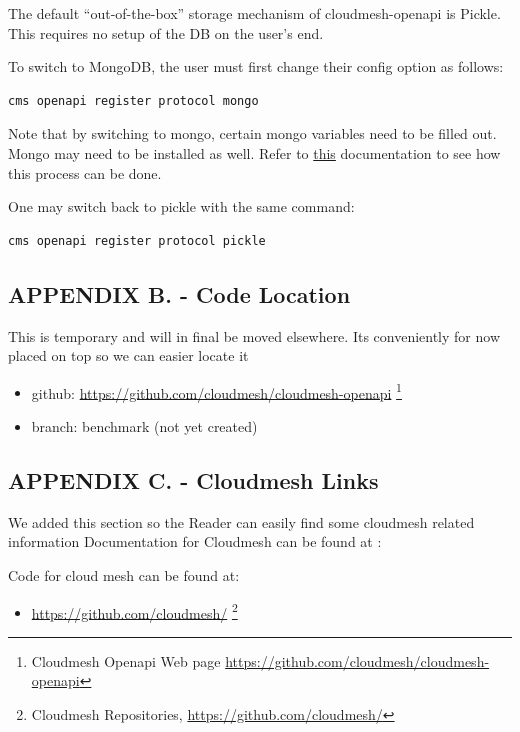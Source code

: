 The default ``out-of-the-box'' storage mechanism of cloudmesh-openapi is
Pickle. This requires no setup of the DB on the user's end.

To switch to MongoDB, the user must first change their config option as
follows:

\begin{verbatim}
cms openapi register protocol mongo
\end{verbatim}

Note that by switching to mongo, certain mongo variables need to be
filled out. Mongo may need to be installed as well. Refer to
\href{https://github.com/cloudmesh/cloudmesh-openapi/\#installation}{this}
documentation to see how this process can be done.

One may switch back to pickle with the same command:

\begin{verbatim}
cms openapi register protocol pickle
\end{verbatim}

\subsection{APPENDIX B. - Code
Location}\label{appendix-b.---code-location}

This is temporary and will in final be moved elsewhere. Its conveniently
for now placed on top so we can easier locate it

\begin{itemize}
\tightlist
\item
  github: \url{https://github.com/cloudmesh/cloudmesh-openapi}
  \footnote{Cloudmesh Openapi Web page
    \url{https://github.com/cloudmesh/cloudmesh-openapi}}
\item
  branch: benchmark (not yet created)
\end{itemize}

\subsection{APPENDIX C. - Cloudmesh
Links}\label{appendix-c.---cloudmesh-links}

We added this section so the Reader can easily find some cloudmesh
related information Documentation for Cloudmesh can be found at \cite{cloudmesh-manual}:

Code for cloud mesh can be found at:

\begin{itemize}
\tightlist
\item
  \url{https://github.com/cloudmesh/} \footnote{Cloudmesh Repositories,
    \url{https://github.com/cloudmesh/}}
\end{itemize}

